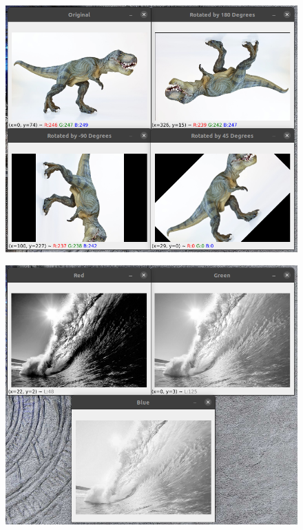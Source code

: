 \documentclass[12pt,letterpaper]{article}
\begin{document}
\begin{multicols}{2}
\begin{figure}[H]
\centering
\includegraphics[width = \columnwidth]{Resultado_ch6_9.png}
\end{figure}

\begin{figure}[H]
\centering
\includegraphics[width = \columnwidth]{Resultado_ch6_10.png}
\end{figure}


\end{multicols}
\end{document}

